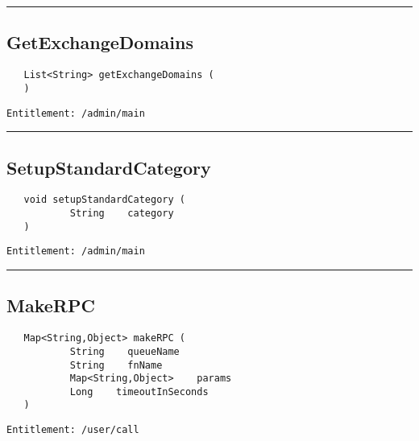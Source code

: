 \rule{12cm}{2pt}
\subsection{GetExchangeDomains}
\label{Api:GetExchangeDomains}
\begin{Verbatim}
   List<String> getExchangeDomains (
   )
\end{Verbatim}
\begin{Verbatim}[formatcom=\color{Maroon}]
  Entitlement: /admin/main
\end{Verbatim}



\rule{12cm}{2pt}
\subsection{SetupStandardCategory}
\label{Api:SetupStandardCategory}
\begin{Verbatim}
   void setupStandardCategory (
           String    category
   )
\end{Verbatim}
\begin{Verbatim}[formatcom=\color{Maroon}]
  Entitlement: /admin/main
\end{Verbatim}



\rule{12cm}{2pt}
\subsection{MakeRPC}
\label{Api:MakeRPC}
\begin{Verbatim}
   Map<String,Object> makeRPC (
           String    queueName
           String    fnName
           Map<String,Object>    params
           Long    timeoutInSeconds
   )
\end{Verbatim}
\begin{Verbatim}[formatcom=\color{Maroon}]
  Entitlement: /user/call
\end{Verbatim}



